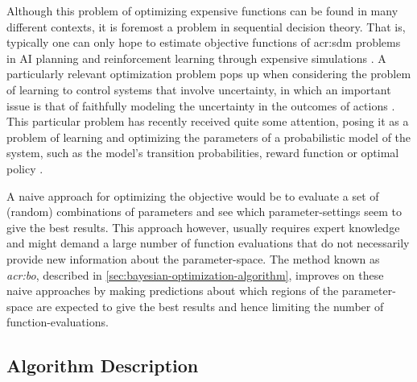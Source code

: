 Although this problem of optimizing expensive functions can be found in many different contexts, it is foremost a problem in sequential decision theory. 
That is, typically one can only hope to estimate objective functions of \acrshort{acr:sdm} problems in AI planning and reinforcement learning through expensive simulations \cite{Brochu2010}. 
A particularly relevant optimization problem pops up when considering the problem of learning to control systems that involve uncertainty, in which an important issue is that of faithfully modeling the uncertainty in the outcomes of actions \cite{Ghahramani2015}.
This particular problem has recently received quite some attention, posing it as a problem of learning and optimizing the parameters of a probabilistic model of the system, such as the model's transition probabilities, reward function or optimal policy \cite{Poupart2010}.

A naive approach for optimizing the objective would be to evaluate a set of (random) combinations of parameters and see which parameter-settings seem to give the best results.
This approach however, usually requires expert knowledge and might demand a large number of function evaluations that do not necessarily provide new information about the parameter-space.
The method known as \textit{\acrlong{acr:bo}}, described in \autoref{sec:bayesian-optimization-algorithm}, improves on these naive approaches by making predictions about which regions of the parameter-space are expected to give the best results and hence limiting the number of function-evaluations.

\subsection{Algorithm Description}
\label{sec:bayesian-optimization-algorithm}

